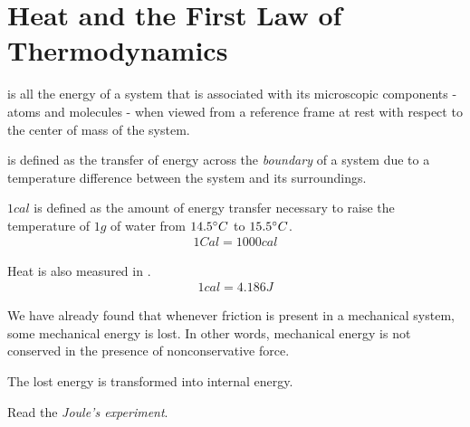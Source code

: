 \chapter{Heat and the First Law of Thermodynamics}


         is all the energy of a system that is associated with
        its microscopic components - atoms and molecules - when viewed from a
        reference frame at rest with respect to the center of mass of the system.

            \par {} is defined as the transfer of energy across the
            \textit{boundary} of a system due to a temperature difference between
            the system and its surroundings.
            \par $1 cal$ is defined as the amount of energy transfer necessary to raise 
            the temperature of $1g$ of water from $14.5 \degree C$ to $15.5 \degree C$.
            \begin{align*}
                1 Cal = 1000 cal
            \end{align*}
            \par Heat is also measured in .
            \begin{align*}
                1 cal = 4.186 J
            \end{align*}
            \par We have already found that whenever friction is present in a
            mechanical system, some mechanical energy is lost. In other words,
            mechanical energy is not conserved in the presence of nonconservative force.
            \par The lost energy is transformed into internal energy.
            \par Read the \textit{Joule's experiment}.
    \hiiEND


